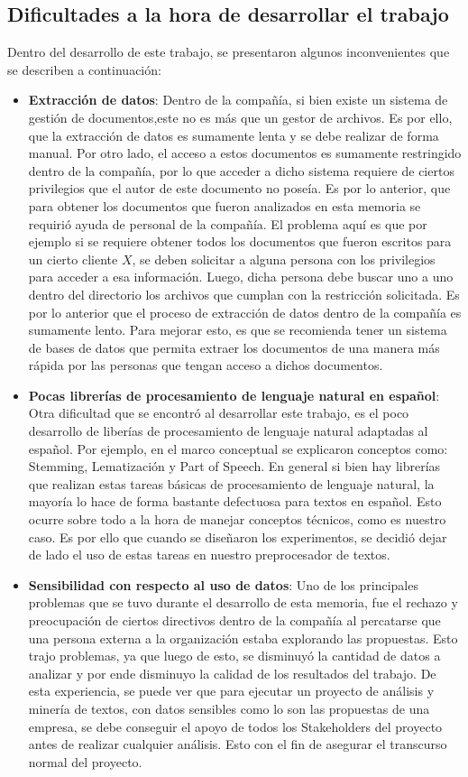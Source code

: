 \subsection{Dificultades a la hora de desarrollar el trabajo}
    Dentro del desarrollo de este trabajo, se presentaron algunos inconvenientes que se describen a continuación:
    \begin{itemize}
        \item \textbf{Extracción de datos}: Dentro de la compañía, si bien existe un sistema de gestión de documentos,este no es más que un gestor de archivos. Es por ello, que la extracción de datos es sumamente lenta y se debe realizar de forma manual. Por otro lado, el acceso a estos documentos es sumamente restringido dentro de la compañía, por lo que acceder a dicho sistema requiere de ciertos privilegios que el autor de este documento no poseía. Es por lo anterior, que para obtener los documentos que fueron analizados en esta memoria se requirió ayuda de personal de la compañía. El problema aquí es que por ejemplo si se requiere obtener todos los documentos que fueron escritos para un cierto cliente $X$, se deben solicitar a alguna persona con los privilegios para acceder a esa información. Luego, dicha persona debe buscar uno a uno dentro del directorio los archivos que cumplan con la restricción solicitada. Es por lo anterior que el proceso de extracción de datos dentro de la compañía es sumamente lento. Para mejorar esto, es que se recomienda tener un sistema de bases de datos que permita extraer los documentos de una manera más rápida por las personas que tengan acceso a dichos documentos.
        \item \textbf{Pocas librerías de procesamiento de lenguaje natural en español}: Otra dificultad que se encontró al desarrollar este trabajo, es el poco desarrollo de liberías de procesamiento de lenguaje natural adaptadas al español. Por ejemplo, en el marco conceptual se explicaron conceptos como: Stemming, Lematización y Part of Speech. En general si bien hay librerías que realizan estas tareas básicas de procesamiento de lenguaje natural, la mayoría lo hace de forma bastante defectuosa para textos en español. Esto ocurre sobre todo a la hora de manejar conceptos técnicos, como es nuestro caso. Es por ello que cuando se diseñaron los experimentos, se decidió dejar de lado el uso de estas tareas en nuestro preprocesador de textos.
        \item \textbf{Sensibilidad con respecto al uso de datos}: Uno de los principales problemas que se tuvo durante el desarrollo de esta memoria, fue el rechazo y preocupación de ciertos directivos dentro de la compañía al percatarse que una persona externa a la organización estaba explorando las propuestas. Esto trajo problemas, ya que luego de esto, se disminuyó la cantidad de datos a analizar y por ende disminuyo la calidad de los resultados del trabajo. De esta experiencia, se puede ver que para ejecutar un proyecto de análisis y minería de textos, con datos sensibles como lo son las propuestas de una empresa, se debe conseguir el apoyo de todos los Stakeholders del proyecto antes de realizar cualquier análisis. Esto con el fin de asegurar el transcurso normal del proyecto.

\end{itemize}
